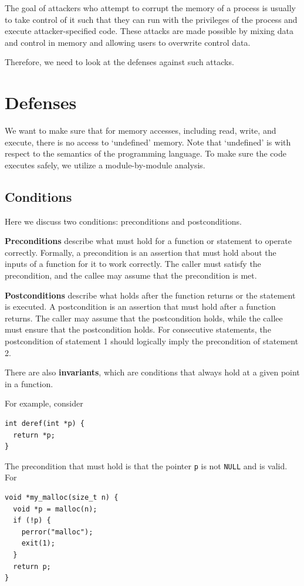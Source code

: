 The goal of attackers who attempt to corrupt the memory of a process is usually to take control of it such that they can run with the privileges of the process and execute attacker-specified code. These attacks are made possible by mixing data and control in memory and allowing users to overwrite control data.

Therefore, we need to look at the defenses against such attacks.

\section{Defenses}
We want to make sure that for memory accesses, including read, write, and execute, there is no access to `undefined' memory. Note that `undefined' is with respect to the semantics of the programming language. To make sure the code executes safely, we utilize a module-by-module analysis.

\subsection{Conditions}
Here we discuss two conditions: preconditions and postconditions.

\textbf{Preconditions} describe what must hold for a function or statement to operate correctly. Formally, a precondition is an assertion that must hold about the inputs of a function for it to work correctly. The caller must satisfy the precondition, and the callee may assume that the precondition is met.

\textbf{Postconditions} describe what holds after the function returns or the statement is executed. A postcondition is an assertion that must hold after a function returns. The caller may assume that the postcondition holds, while the callee must ensure that the postcondition holds. For consecutive statements, the postcondition of statement 1 should logically imply the precondition of statement 2.

There are also \textbf{invariants}, which are conditions that always hold at a given point in a function.

For example, consider

\begin{verbatim}
int deref(int *p) {
  return *p;
}
\end{verbatim}

The precondition that must hold is that the pointer \texttt{p} is not \texttt{NULL} and is valid. For

\begin{verbatim}
void *my_malloc(size_t n) {
  void *p = malloc(n);
  if (!p) { 
    perror("malloc"); 
    exit(1); 
  }
  return p;
}
\end{verbatim}

